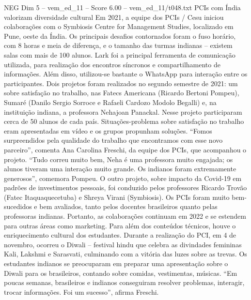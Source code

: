 \begin{textsample}{NEG Dim 5 – vem\_ed\_11 – Score 6.00 – vem\_ed\_11/t048.txt}  \label{ex:f5_neg_060}
PCIs com Índia valorizam diversidade cultural Em 2021, a equipe dos PCIs / Cesu iniciou colaborações com o Symbiosis Centre for Management Studies, localizado em Pune, oeste da Índia.
Os principais desafios contornados foram o fuso horário, com 8 horas e meia de diferença, e o tamanho das turmas indianas – existem salas com mais de 100 alunos.
Lark foi a principal ferramenta de comunicação utilizada, para realização dos encontros síncronos e compartilhamento de informações.
Além disso, utilizou-se bastante o WhatsApp para interação entre os participantes.
Dois projetos foram realizados no segundo semestre de 2021: um sobre satisfação no trabalho, nas Fatecs Americana (Ricardo Bertoni Pompeu), Sumaré (Danilo Sergio Sorroce e Rafaeli Cardozo Modolo Begalli) e, na instituição indiana, a professora Nehajoan Panackal.
Nesse projeto participaram cerca de 50 alunos de cada país.
Situações-problema sobre satisfação no trabalho eram apresentadas em vídeo e os grupos propunham soluções. “Fomos surpreendidos pela qualidade do trabalho que encontramos com esse novo parceiro”, comenta Ana Carolina Freschi, da equipe dos PCIs, que acompanhou o projeto. “Tudo correu muito bem, Neha é uma professora muito engajada; os alunos tiveram uma interação muito grande.
Os indianos foram extremamente generosos”, comemora Pompeu.
O outro projeto, sobre impacto da Covid-19 em padrões de investimentos pessoais, foi conduzido pelos professores Ricardo Trovão (Fatec Itaquaquecetuba) e Shreya Virani (Symbiosis).
Os PCIs foram muito bem-sucedidos e bem avaliados, tanto pelos docentes brasileiros quanto pelas professoras indianas.
Portanto, as colaborações continuam em 2022 e se estendem para outras áreas como marketing.
Para além dos conteúdos técnicos, houve o enriquecimento cultural dos estudantes.
Durante a realização do PCI, em 4 de novembro, ocorreu o Diwali – festival hindu que celebra as divindades femininas Kali, Lakshmi e Sarasvati, culminando com a vitória das luzes sobre as trevas.
Os estudantes indianos se preocuparam em preparar uma apresentação sobre o Diwali para os brasileiros, contando sobre comidas, vestimentas, músicas. “Em poucas semanas, brasileiros e indianos conseguiram resolver problemas, interagir, trocar informações.
Foi um sucesso”, afirma Freschi.

\end{textsample}
